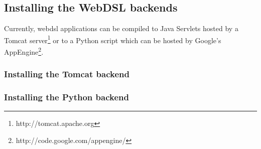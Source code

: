 \subsection{Installing the WebDSL backends}\label{installbackend}
Currently, webdsl applications can be compiled to Java Servlets hosted by a Tomcat server\footnote{http://tomcat.apache.org} or to a Python script which can be hosted by Google's AppEngine\footnote{http://code.google.com/appengine/}. 

\subsubsection{Installing the Tomcat backend}

\subsubsection{Installing the Python backend}
